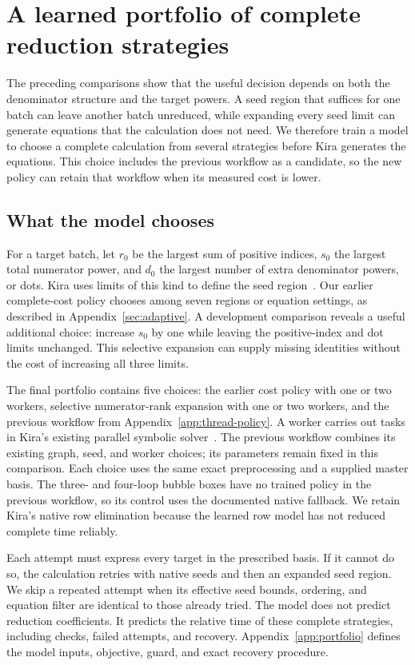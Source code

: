 \section{A learned portfolio of complete reduction strategies}
\label{sec:portfolio}
The preceding comparisons show that the useful decision depends on both the denominator structure and the target powers. A seed region that suffices for one batch can leave another batch unreduced, while expanding every seed limit can generate equations that the calculation does not need. We therefore train a model to choose a complete calculation from several strategies before Kira generates the equations. This choice includes the previous workflow as a candidate, so the new policy can retain that workflow when its measured cost is lower.

\subsection{What the model chooses}
For a target batch, let $r_0$ be the largest sum of positive indices, $s_0$ the largest total numerator power, and $d_0$ the largest number of extra denominator powers, or dots. Kira uses limits of this kind to define the seed region~\cite{Kira3}. Our earlier complete-cost policy chooses among seven regions or equation settings, as described in Appendix~\ref{sec:adaptive}. A development comparison reveals a useful additional choice: increase $s_0$ by one while leaving the positive-index and dot limits unchanged. This selective expansion can supply missing identities without the cost of increasing all three limits.

The final portfolio contains five choices: the earlier cost policy with one or two workers, selective numerator-rank expansion with one or two workers, and the previous workflow from Appendix~\ref{app:thread-policy}. A worker carries out tasks in Kira's existing parallel symbolic solver~\cite{KiraOriginal}. The previous workflow combines its existing graph, seed, and worker choices; its parameters remain fixed in this comparison. Each choice uses the same exact preprocessing and a supplied master basis. The three- and four-loop bubble boxes have no trained policy in the previous workflow, so its control uses the documented native fallback. We retain Kira's native row elimination because the learned row model has not reduced complete time reliably.

Each attempt must express every target in the prescribed basis. If it cannot do so, the calculation retries with native seeds and then an expanded seed region. We skip a repeated attempt when its effective seed bounds, ordering, and equation filter are identical to those already tried. The model does not predict reduction coefficients. It predicts the relative time of these complete strategies, including checks, failed attempts, and recovery. Appendix~\ref{app:portfolio} defines the model inputs, objective, guard, and exact recovery procedure.

